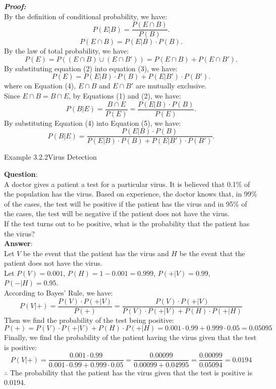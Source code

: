 \documentclass{book}
\begin{document}
\textbf{\large{\textit{Proof:}}}\\
By the definition of conditional probability, we have: 
\[
P(E|B) = \frac{P(E \cap B)}{P(B)} .\tag{1}
\]
\[
P(E \cap B) = P(E|B) \cdot P(B) .\tag{2}
\]
By the law of total probability, we have: 
\[
P(E) = P((E \cap B) \cup (E \cap B')) = P(E \cap B) + P(E \cap B') .\tag{3}
\]
By substituting equation (2) into equation (3), we have:
\[
P(E) = P(E|B) \cdot P(B) + P(E|B') \cdot P(B') .\tag{4}
\]
where on Equation (4), \(E \cap B\) and \(E \cap B'\) are mutually exclusive.\\
Since \(E \cap B = B \cap E\), by Equations (1) and (2), we have:
\[
P(B|E) = \frac{B \cap E}{P(E)} = \frac{P(E|B) \cdot P(B)}{P(E)}.\tag{5}
\]
By substituting Equation (4) into Equation (5), we have:
\[
P(B|E) = \frac{P(E|B) \cdot P(B)}{P(E|B) \cdot P(B) + P(E|B') \cdot P(B')} .\tag{6}
\]
\newpage
\begin{egBox}{Example 3.2.2}{Virus Detection}
    \raggedright
    \textbf{Question}: \\
    A doctor gives a patient a test for a particular virus. It is believed that 0.1\% of the population has the virus. Based on experience, the doctor knows that, in 99\% of the cases, the test will be positive if the patient has the virus and in 95\% of the cases, the test will be negative if the patient does not have the virus.\\
    If the test turns out to be positive, what is the probability that the patient has the virus?\\
    \vspace{2mm}
    \textbf{Answer}: \\
    Let \(V\) be the event that the patient has the virus and \(H\) be the event that the patient does not have the virus.\\
    Let \(P(V) = 0.001\), \(P(H) = 1-0.001 = 0.999\), \(P(+|V) = 0.99\), \(P(-|H) = 0.95\).\\
    According to Bayes' Rule, we have:
    \[
        P(V|+) = \frac{P(V) \cdot P(+|V)}{P(+)} = \frac{P(V) \cdot P(+|V)}{P(V) \cdot P(+|V) + P(H) \cdot P(+|H)}
    \]
    Then we find the probability of the test being positive:
    \[
        P(+) = P(V) \cdot P(+|V) + P(H) \cdot P(+|H) = 0.001 \cdot 0.99 + 0.999 \cdot 0.05 = 0.05095
    \]
    Finally, we find the probability of the patient having the virus given that the test is positive:
    \[
        P(V|+) = \frac{0.001 \cdot 0.99}{0.001 \cdot 0.99 + 0.999 \cdot 0.05} = \frac{0.00099}{0.00099 + 0.04995} = \frac{0.00099}{0.05094} = 0.0194
    \]
    $\therefore$ The probability that the patient has the virus given that the test is positive is 0.0194.
\end{egBox}
\end{document}
